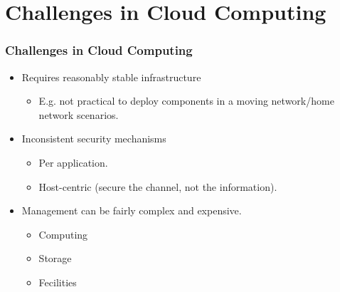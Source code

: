 \documentclass [12pt] {beamer}
\begin{document}
\section{Challenges in Cloud Computing}
\begin{frame}
\frametitle{Challenges in Cloud Computing}
\begin{itemize}
 \item Requires reasonably stable infrastructure
    \begin{itemize}
     \item E.g. not practical to deploy components in a moving network/home network scenarios.
    \end{itemize}
 \item  Inconsistent security mechanisms
    \begin{itemize}
     \item Per application.
     \item Host-centric (secure the channel, not the information).
    \end{itemize}
 \item Management can be fairly complex and expensive.
    \begin{itemize}
     \item Computing
     \item Storage
     \item Fecilities
    \end{itemize}

\end{itemize}
\end{frame}
\end{document}
